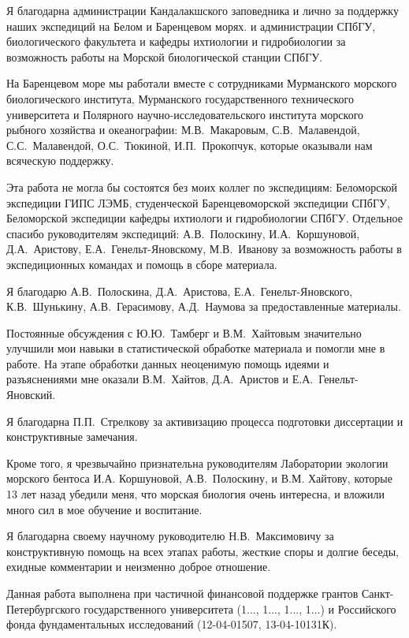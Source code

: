 Я благодарна администрации Кандалакшского заповедника и лично  за поддержку наших экспедиций на Белом и Баренцевом морях.
и администрации СПбГУ, биологического факультета и кафедры ихтиологии и гидробиологии за возможность работы на Морской биологической станции СПбГУ.

На Баренцевом море мы работали вместе с сотрудниками Мурманского морского биологического института, Мурманского государственного технического университета и Полярного научно-исследовательского института морского рыбного хозяйства и океанографии: М.\:В.~Макаровым, С.\:В.~Малавендой, С.\:С.~Малавендой, О.\:С.~Тюкиной, И.\:П.~Прокопчук, которые оказывали нам всяческую поддержку.  

Эта работа не могла бы состоятся без моих коллег по экспедициям: Беломорской экспедиции ГИПС ЛЭМБ, студенческой Баренцевоморской экспедиции СПбГУ, Беломорской экспедиции кафедры ихтиологи и гидробиологии СПбГУ. 
Отдельное спасибо руководителям экспедиций: А.\:В.~Полоскину, И.\:А.~Коршуновой, Д.\:А.~Аристову, Е.\:А.~Генельт-Яновскому, М.В.~Иванову за возможность работы в экспедиционных командах и помощь в сборе материала.

Я благодарю А.\:В.~Полоскина, Д.\:А.~Аристова, Е.\:А.~Генельт-Яновского, К.\:В.~Шунькину, А.\:В.~Герасимову, А.\:Д.~Наумова за предоставленные материалы.

Постоянные обсуждения с Ю.\:Ю.~Тамберг и В.\:М.~Хайтовым значительно улучшили мои навыки в статистической обработке материала и помогли мне в работе.
На этапе обработки данных неоценимую помощь идеями и разъяснениями мне оказали В.\:М.~Хайтов, Д.\:А.~Аристов и Е.\:А.~Генельт-Яновский.

Я благодарна П.\:П.~Стрелкову за активизацию процесса подготовки диссертации и конструктивные замечания.

Кроме того, я чрезвычайно признательна руководителям Лаборатории экологии морского бентоса И.\:А. Коршуновой, А.\:В.~Полоскину,  и В.\:М. Хайтову, которые 13 лет назад убедили меня, что морская биология очень интересна, и вложили много сил в мое обучение и воспитание. 


Я благодарна своему научному руководителю Н.\:В.~Максимовичу за конструктивную помощь на всех этапах работы, жесткие споры и долгие беседы, ехидные комментарии и неизменно доброе отношение.

\vspace{3ex}

Данная работа выполнена при частичной финансовой поддержке грантов Санкт-Петер\-бург\-ского государственного университета (1..., 1..., 1..., 1...) и Российского фонда фундаментальных исследований (12-04-01507, 13-04-10131\:К). 

